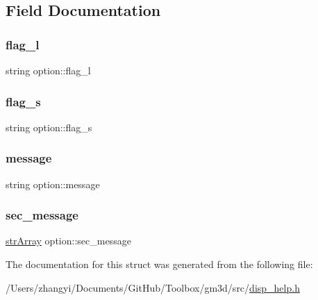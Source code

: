 \subsection{Field Documentation}
\mbox{\label{structoption_a3dbb017d487a73bf3873a725d3d49a2a}} 
\subsubsection{\texorpdfstring{flag\_l}{flag\_l}}
{\footnotesize\ttfamily string option\+::flag\+\_\+l}

\mbox{\label{structoption_acaef23dbc3257d4604ff42387da63b28}} 
\subsubsection{\texorpdfstring{flag\_s}{flag\_s}}
{\footnotesize\ttfamily string option\+::flag\+\_\+s}

\mbox{\label{structoption_aec1e910654c73404ea9ff124937227f4}} 
\subsubsection{\texorpdfstring{message}{message}}
{\footnotesize\ttfamily string option\+::message}

\mbox{\label{structoption_a2d5f7a0b934f84ce418c59cdcfece4a8}} 
\subsubsection{\texorpdfstring{sec\_message}{sec\_message}}
{\footnotesize\ttfamily \mbox{\hyperlink{disp__help_8h_acb0204177ba52d9ff9cd0117150d0bba}{str\+Array}} option\+::sec\+\_\+message}



The documentation for this struct was generated from the following file\+:\begin{DoxyCompactItemize}
\item 
/\+Users/zhangyi/\+Documents/\+Git\+Hub/\+Toolbox/gm3d/src/\mbox{\hyperlink{disp__help_8h}{disp\+\_\+help.\+h}}\end{DoxyCompactItemize}
